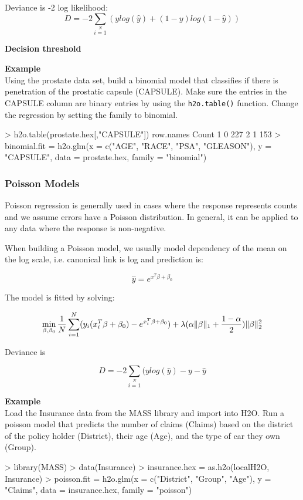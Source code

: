 \documentclass[11pt]{article}
\begin{document}
Deviance is -2 log likelihood:
\[D = -2\sum\limits_{i=1}\limits^{N}{(y log(\hat{y}) + (1 - y)log(1-\hat{y})  )}\]

\textbf{Decision threshold}

\textbf{Example}\\
Using the prostate data set, build a binomial model that classifies if there is penetration of the prostatic capsule (CAPSULE). Make sure the entries in the CAPSULE column are binary entries by using the \texttt{h2o.table()} function. Change the regression by setting the family to binomial.
\begin{spverbatim}
> h2o.table(prostate.hex[,"CAPSULE"])
  row.names Count
1         0   227
2         1   153
> binomial.fit = h2o.glm(x = c("AGE", "RACE", "PSA", "GLEASON"), y = "CAPSULE", data = prostate.hex, family = "binomial")
\end{spverbatim}

\subsubsection{Poisson Models}
Poisson regression is generally used in cases where the response represents counts and we assume errors have a Poisson distribution. In general, it can be applied to any data where the response is non-negative. 

When building a Poisson model, we usually model dependency of the mean on the log scale, i.e. canonical link is log and prediction is:

\[\hat{y} = e^{x^T\beta + \beta_0}\]

The model is fitted by solving:

\[  \min\limits_{\beta,\beta_0} { {1 \over N}\sum\limits_{i=1}\limits^{N}(y_i (x_i^{T}\beta  + \beta_0) - e^{x_i^{T}\beta  + \beta_0})  + \lambda (\alpha \|\beta \|_1 + {1-\alpha \over 2}) \| \beta \|_2^2} \]

Deviance is 

\[D = -2\sum\limits_{i=1}\limits^{N}{(y log(\hat{y}) - y - \hat{y}}\]


\textbf{Example}\\
Load the Insurance data from the MASS library and import into H2O. Run a poisson model that predicts the number of claims (Claims) based on the district of the policy holder (District), their age (Age), and the type of car they own (Group).
\begin{spverbatim}
> library(MASS)
> data(Insurance)
> insurance.hex = as.h2o(localH2O, Insurance)
> poisson.fit = h2o.glm(x = c("District", "Group", "Age"), y = "Claims", 
data = insurance.hex, family = "poisson")
\end{spverbatim}
\end{document}
